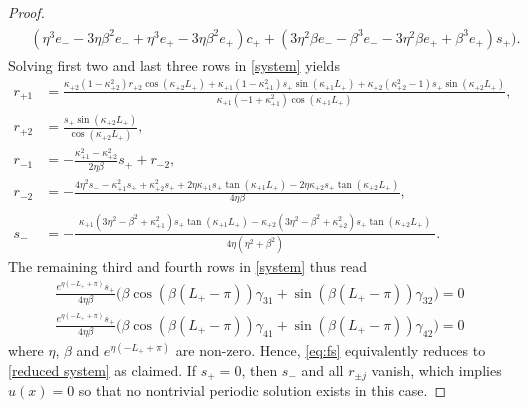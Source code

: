 \documentclass{article}
\numberwithin{equation}{section}
\begin{document}
\begin{proof}
\begin{align}
\begin{split}
				&
				(\eta^3 e_-  - 3\eta \beta^2 e_-  + \eta^3 e_+  - 3\eta \beta^2 e_+) c_+ 
				+ (3\eta^2 \beta e_-  - \beta^3 e_-  - 3\eta^2 \beta e_+  + \beta^3 e_+ ) s_+				
				\big).
			\end{split}
		\end{align}
		Solving first two and last three rows in \eqref{system} yields
		\begin{equation} \label{eq:rs}
		\begin{aligned}
			r_{+1} &= 
			\frac{
					\kappa_{+2} (1-\kappa_{+2}^2) r_{+2} \cos(\kappa_{+2} L_+) 
					+ \kappa_{+1} (1 - \kappa_{+1}^2) s_+ \sin(\kappa_{+1} L_+)  
					+ \kappa_{+2} (\kappa_{+2}^2-1) s_+ \sin(\kappa_{+2} L_+) 
			}{
				\kappa_{+1} (-1 + \kappa_{+1}^2) \cos(\kappa_{+1} L_+)
			},\\
			r_{+2} &= \frac{s_+ \sin(\kappa_{+2} L_+)}{\cos(\kappa_{+2} L_+)},\\
			r_{-1} &= -\frac{\kappa_{+1}^2 - \kappa_{+2}^2}{2 \eta \beta} s_+ + r_{-2},\\
			r_{-2} &= -
			\frac{
					4 \eta^2 s_- -\kappa_{+1}^2 s_+ + \kappa_{+2}^2 s_+ 
					+ 2\eta \kappa_{+1} s_+ \tan(\kappa_{+1} L_+) 
					- 2\eta \kappa_{+2} s_+ \tan(\kappa_{+2} L_+)
			}{4 \eta \beta},\\
			s_- &= -
			\frac{
				\begin{aligned}
					\kappa_{+1}(3\eta^2 -\beta^2 +\kappa_{+1}^2) s_+ \tan(\kappa_{+1} L_+) 
					-\kappa_{+2}(3\eta^2 -\beta^2 +\kappa_{+2}^2) s_+ \tan(\kappa_{+2} L_+)
				\end{aligned}				
			}{4\eta (\eta^2 + \beta^2)}.
		\end{aligned}\end{equation}		
The remaining third and fourth rows in \eqref{system} thus read
		\begin{equation}\label{eq:fs}
		\begin{aligned}
			\frac{e^{\eta (-L_+ + \pi)}s_+}{4 \eta \beta} \bigl( \beta \cos(\beta(L_+-\pi)) \gamma_{31} + \sin(\beta(L_+-\pi)) \gamma_{32} \bigl) =0\\
			\frac{e^{\eta (-L_+ + \pi)}s_+}{4 \eta \beta} \bigl( \beta \cos(\beta(L_+-\pi)) \gamma_{41} + \sin(\beta(L_+-\pi)) \gamma_{42} \bigl) =0
		\end{aligned}
		\end{equation}
		where $\eta$, $\beta$ and $e^{\eta(-L_+ + \pi)}$ are non-zero. 
		Hence, \eqref{eq:fs} equivalently reduces to \eqref{reduced system} as claimed. 
		If $s_+ = 0$, then $s_{-}$ and all $r_{\pm j}$ vanish, which implies $u(x)=0$ so that no nontrivial periodic solution exists in this case.
	\end{proof}
		
\end{document}
